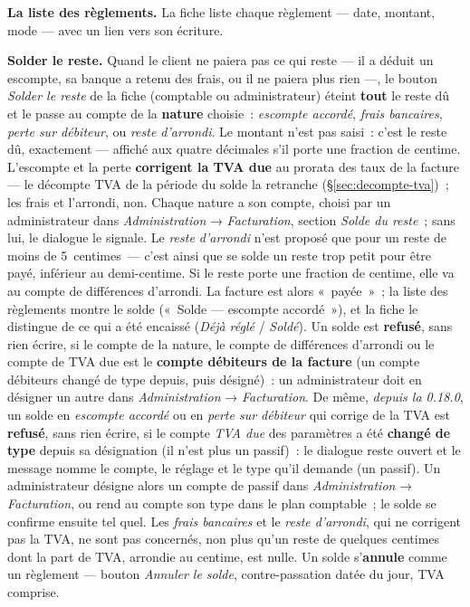 \documentclass[a4paper,11pt,oneside]{article}
\begin{document}
\textbf{La liste des règlements.} La fiche liste chaque règlement --- date, montant, mode --- avec
un lien vers son écriture.

\textbf{Solder le reste.} Quand le client ne paiera pas ce qui reste --- il a déduit un escompte,
sa banque a retenu des frais, ou il ne paiera plus rien ---, le bouton \emph{Solder le reste} de la
fiche (comptable ou administrateur) éteint \textbf{tout} le reste dû et le passe au compte de la
\textbf{nature} choisie~: \emph{escompte accordé}, \emph{frais bancaires}, \emph{perte sur
débiteur}, ou \emph{reste d'arrondi}. Le montant n'est pas saisi~: c'est le reste dû, exactement
--- affiché aux quatre décimales s'il porte une fraction de centime. L'escompte et la perte \textbf{corrigent la TVA due} au prorata des taux de la facture --- le
décompte TVA de la période du solde la retranche (\S\ref{sec:decompte-tva})~; les
frais et l'arrondi, non. Chaque nature a son compte, choisi par un administrateur dans
\emph{Administration} → \emph{Facturation}, section \emph{Solde du reste}~; sans lui, le dialogue le
signale. Le \emph{reste d'arrondi} n'est proposé que pour un reste de moins de 5~centimes~--- c'est
ainsi que se solde un reste trop petit pour être payé, inférieur au demi-centime. Si le reste porte
une fraction de centime, elle va au compte de différences d'arrondi. La facture est alors
«~payée~»~; la liste des règlements montre le solde («~Solde --- escompte accordé~»), et la fiche le
distingue de ce qui a été encaissé (\emph{Déjà réglé} / \emph{Soldé}). Un solde est
\textbf{refusé}, sans rien écrire, si le compte de la nature, le compte de différences d'arrondi
ou le compte de TVA due est le \textbf{compte débiteurs de la facture} (un compte débiteurs
changé de type depuis, puis désigné)~: un administrateur doit en désigner un autre dans
\emph{Administration} → \emph{Facturation}. De même, \emph{depuis la 0.18.0}, un solde en
\emph{escompte accordé} ou en \emph{perte sur débiteur} qui corrige de la TVA est
\textbf{refusé}, sans rien écrire, si le compte \emph{TVA due} des paramètres a été
\textbf{changé de type} depuis sa désignation (il n'est plus un passif)~: le dialogue reste
ouvert et le message nomme le compte, le réglage et le type qu'il demande (un passif). Un
administrateur désigne alors un compte de passif dans \emph{Administration} →
\emph{Facturation}, ou rend au compte son type dans le plan comptable~; le solde se confirme
ensuite tel quel. Les \emph{frais bancaires} et le \emph{reste d'arrondi}, qui ne corrigent pas la
TVA, ne sont pas concernés, non plus qu'un reste de quelques centimes dont la part de TVA,
arrondie au centime, est nulle. Un solde s'\textbf{annule}
comme un règlement --- bouton \emph{Annuler le solde}, contre-passation datée du jour, TVA
comprise.
\end{document}
